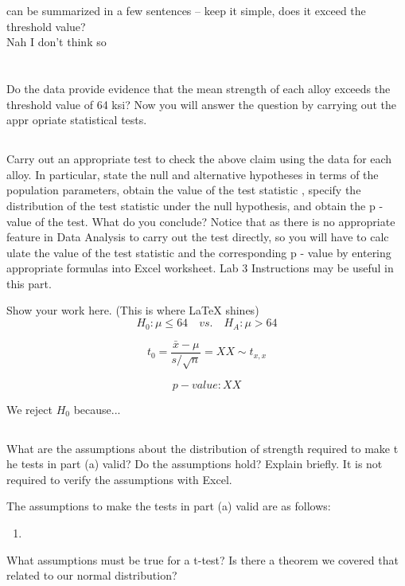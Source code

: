 \documentclass[letterpaper]{article}
\begin{document}
can be summarized in a few sentences -- keep it simple, does it exceed the
threshold value?\\

Nah I don't think so

\section{}%
Do the data provide evidence that the mean strength of each alloy exceeds the
threshold value of 64 ksi?  Now you will answer the question by carrying out the
appr opriate statistical tests.
\subsection{}%
Carry out an appropriate test to check the above claim using the data for each
alloy. In particular, state  the null and alternative hypotheses in terms of the
population parameters, obtain the value of the test  statistic , specify the
distribution of the test statistic under the null hypothesis, and obtain the  p
- value of  the test. What do you conclude? Notice that as there is no
appropriate feature in  Data Analysis to  carry out the test directly,  so  you
will have to calc ulate the value of the test statistic and the  corresponding
p - value by entering appropriate formulas into Excel worksheet.  Lab 3
Instructions may  be useful in this part.

Show your work here. (This is where \LaTeX{} shines)
$$H_0: \mu \leq 64 \quad vs. \quad H_A: \mu > 64 $$

$$t_0 = \frac{\bar{x}-\mu}{s/\sqrt{n}} = XX \sim t_{x,x}$$

$$ {p-value}: XX $$

We reject $H_0$ because...


\subsection{}%
What are the assumptions about the distribution of strength required to make t
he tests in part (a) valid?  Do the assumptions hold? Explain briefly. It is not
required to verify the assumptions with Excel.

The assumptions to make the tests in part (a) valid are as follows:

\begin{enumerate}
 \item
\end{enumerate}

What assumptions must be true for a t-test? Is there a theorem we covered that
related to our normal distribution?
\end{document}
